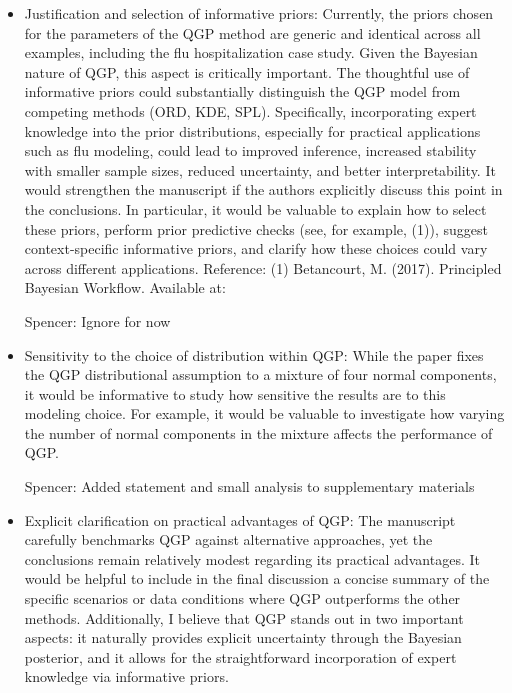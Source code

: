 \documentclass{article}
\newcommand{\spencer}[1]{{\color{blue} Spencer: #1}}
\begin{document}
\begin{itemize}
\item Justification and selection of informative priors:
 Currently, the priors chosen for the parameters of the QGP method are generic 
 and identical across all examples, including the flu hospitalization case 
 study. Given the Bayesian nature of QGP, this aspect is critically important. 
 The thoughtful use of informative priors could substantially distinguish the 
 QGP model from competing methods (ORD, KDE, SPL). Specifically, incorporating 
 expert knowledge into the prior distributions, especially for practical 
 applications such as flu modeling, could lead to improved inference, 
 increased stability with smaller sample sizes, reduced uncertainty, and 
 better interpretability. It would strengthen the manuscript if the authors 
 explicitly discuss this point in the conclusions. In particular, it would be 
 valuable to explain how to select these priors, perform prior predictive 
 checks (see, for example, (1)), suggest context-specific informative priors, 
 and clarify how these choices could vary across different applications.
Reference:
(1) Betancourt, M. (2017). Principled Bayesian Workflow. Available at:
\href{https://betanalpha.github.io/assets/case_studies/principled_bayesian_workflow.html}{}

\spencer{Ignore for now}

\item Sensitivity to the choice of distribution within QGP:
 While the paper fixes the QGP distributional assumption to a mixture of four 
 normal components, it would be informative to study how sensitive the results 
 are to this modeling choice. For example, it would be valuable to investigate 
 how varying the number of normal components in the mixture affects the 
 performance of QGP.
 
 \spencer{Added statement and small analysis to supplementary materials}

\item Explicit clarification on practical advantages of QGP:
 The manuscript carefully benchmarks QGP against alternative approaches, yet 
 the conclusions remain relatively modest regarding its practical advantages. 
 It would be helpful to include in the final discussion a concise summary of 
 the specific scenarios or data conditions where QGP outperforms the other 
 methods. Additionally, I believe that QGP stands out in two important aspects: 
 it naturally provides explicit uncertainty through the Bayesian posterior, and 
 it allows for the straightforward incorporation of expert knowledge via 
 informative priors.
 
\end{itemize}
\end{document}

